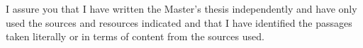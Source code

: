 \begin{otherlanguage}{ngerman}
%
%
{}
%
I assure you that I have written the Master's thesis independently and have only used the sources
and resources indicated and that I have identified the passages taken literally or in terms of
content from the sources used.\\[2ex]
\hfill{}\\[1cm]
\makebox[5cm]{\hrulefill}\hfill\makebox[4cm]{\hrulefill}

\end{otherlanguage}
